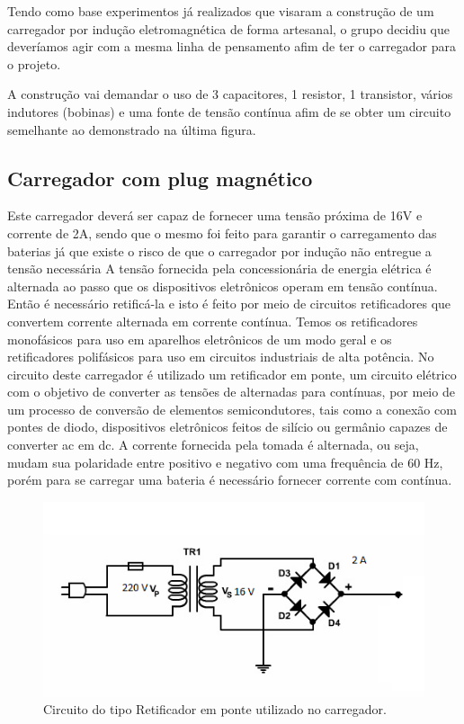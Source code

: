 Tendo como base experimentos já realizados que visaram a construção de um carregador por indução eletromagnética de forma artesanal, o grupo decidiu que deveríamos agir com a mesma linha de pensamento afim de ter o carregador para o projeto.

A construção vai demandar o uso de 3 capacitores, 1 resistor, 1 transistor, vários indutores (bobinas) e uma fonte de tensão contínua afim de se obter um circuito semelhante ao demonstrado na última figura.


\subsection{Carregador com plug magnético}

Este carregador deverá ser capaz de fornecer uma tensão próxima de 16V e corrente de 2A, sendo que o mesmo foi feito para garantir o carregamento das baterias já que existe o risco de que o carregador por indução não entregue a tensão necessária
A tensão fornecida pela concessionária de energia elétrica é alternada ao passo que os dispositivos eletrônicos operam em tensão contínua. Então é necessário retificá-la e isto é feito por meio de circuitos retificadores que convertem corrente alternada em corrente contínua. Temos os retificadores monofásicos para uso em aparelhos eletrônicos de um modo geral e os retificadores polifásicos para uso em circuitos industriais de alta potência. 
No circuito deste carregador é utilizado um retificador em ponte, um circuito elétrico com o objetivo de converter as tensões de alternadas para contínuas, por meio de um processo de conversão de elementos semicondutores, tais como a conexão com pontes de diodo, dispositivos eletrônicos feitos de silício ou germânio capazes de converter ac em dc. A corrente fornecida pela tomada é alternada, ou seja, mudam sua polaridade entre positivo e negativo com uma frequência de 60 Hz, porém para se carregar uma bateria é necessário fornecer corrente com contínua.

 \begin{figure}[H]
	\centering
	\includegraphics[scale=0.5]{figuras/circuitoretificadorcarregador}
	\caption{Circuito do tipo Retificador em ponte utilizado no carregador.}
	\label{img:circuitoretificadorcarregador}
\end{figure}

